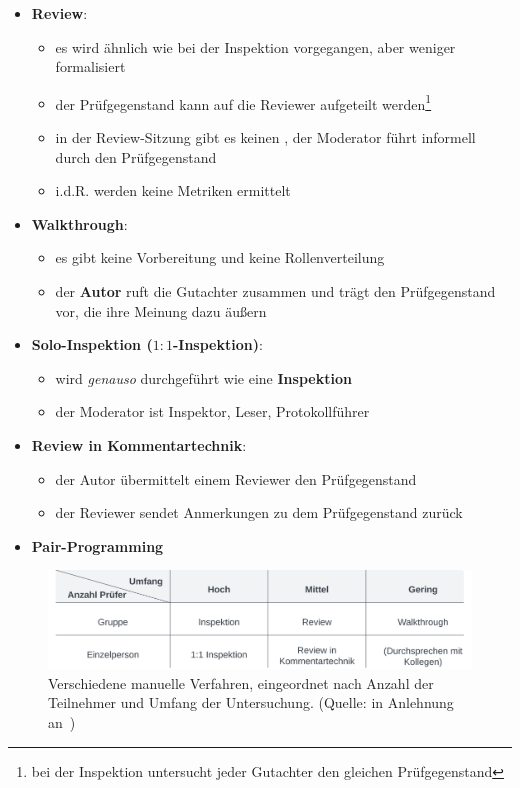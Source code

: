 \begin{tcolorbox}[title=Manuelle Prüfverfahren]
    \begin{itemize}
        \item \textbf{Review}:
        \begin{itemize}
            \item es wird ähnlich wie bei der Inspektion vorgegangen, aber weniger formalisiert
            \item der Prüfgegenstand kann auf die Reviewer aufgeteilt werden\footnote{
                bei der Inspektion untersucht jeder Gutachter den gleichen Prüfgegenstand
            }
            \item in der Review-Sitzung gibt es keinen , der Moderator führt informell durch den Prüfgegenstand
            \item i.d.R. werden keine Metriken ermittelt
        \end{itemize}
        \item \textbf{Walkthrough}:
        \begin{itemize}
            \item es gibt keine Vorbereitung und keine Rollenverteilung
            \item der \textbf{Autor} ruft die Gutachter zusammen und trägt den Prüfgegenstand vor, die ihre Meinung dazu äußern
        \end{itemize}
        \item \textbf{Solo-Inspektion ($1:1$-Inspektion)}:
        \begin{itemize}
            \item wird \textit{genauso} durchgeführt wie eine \textbf{Inspektion}
            \item der Moderator ist Inspektor, Leser, Protokollführer
        \end{itemize}
        \item \textbf{Review in Kommentartechnik}:
        \begin{itemize}
            \item der Autor übermittelt einem Reviewer den Prüfgegenstand
            \item der Reviewer sendet Anmerkungen zu dem Prüfgegenstand zurück
        \end{itemize}
        \item \textbf{Pair-Programming}
    \end{itemize}

\end{tcolorbox}

\begin{figure}
    \centering
    \includegraphics[scale=0.4]{part four/Manuelle Verfahren/img/manuelleverfahren}
    \caption{Verschiedene manuelle Verfahren, eingeordnet nach Anzahl der Teilnehmer und Umfang der Untersuchung. (Quelle: in Anlehnung an~\cite[Tab. 3.1, 17]{Wed09c})}
    \label{fig:manuelleverfahren-cc}
\end{figure}